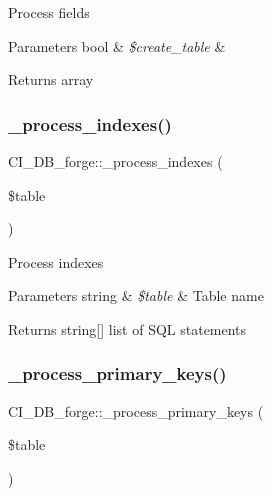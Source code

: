 Process fields


\begin{DoxyParams}[1]{Parameters}
bool & {\em \$create\+\_\+table} & \\
\hline
\end{DoxyParams}
\begin{DoxyReturn}{Returns}
array 
\end{DoxyReturn}
\mbox{\label{class_c_i___d_b__forge_acae6e425a488f684e9685fbe8302379a}} 
\subsubsection{\texorpdfstring{\+\_\+process\+\_\+indexes()}{\_process\_indexes()}}
{\footnotesize\ttfamily C\+I\+\_\+\+D\+B\+\_\+forge\+::\+\_\+process\+\_\+indexes (\begin{DoxyParamCaption}\item[{}]{\$table }\end{DoxyParamCaption})\hspace{0.3cm}{\ttfamily [protected]}}

Process indexes


\begin{DoxyParams}[1]{Parameters}
string & {\em \$table} & Table name \\
\hline
\end{DoxyParams}
\begin{DoxyReturn}{Returns}
string\mbox{[}\mbox{]} list of S\+QL statements 
\end{DoxyReturn}
\mbox{\label{class_c_i___d_b__forge_aa7a1cb6e5cc387622c03e89cc4edb1c2}} 
\subsubsection{\texorpdfstring{\+\_\+process\+\_\+primary\+\_\+keys()}{\_process\_primary\_keys()}}
{\footnotesize\ttfamily C\+I\+\_\+\+D\+B\+\_\+forge\+::\+\_\+process\+\_\+primary\+\_\+keys (\begin{DoxyParamCaption}\item[{}]{\$table }\end{DoxyParamCaption})\hspace{0.3cm}{\ttfamily [protected]}}

